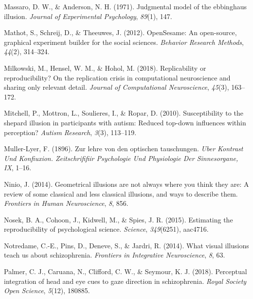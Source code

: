 \documentclass[
  english,
  man,floatsintext]{apa6}
\newlength{\cslhangindent}
\newenvironment{cslreferences}%
  {\setlength{\parindent}{0pt}%
  \everypar{\setlength{\hangindent}{\cslhangindent}}\ignorespaces}%
  {\par}
\begin{document}
\begin{cslreferences}
\leavevmode\hypertarget{ref-massaro1971judgmental}{}%
Massaro, D. W., \& Anderson, N. H. (1971). Judgmental model of the ebbinghaus illusion. \emph{Journal of Experimental Psychology}, \emph{89}(1), 147.

\leavevmode\hypertarget{ref-mathot2012opensesame}{}%
Mathot, S., Schreij, D., \& Theeuwes, J. (2012). OpenSesame: An open-source, graphical experiment builder for the social sciences. \emph{Behavior Research Methods}, \emph{44}(2), 314--324.

\leavevmode\hypertarget{ref-milkowski2018replicability}{}%
Milkowski, M., Hensel, W. M., \& Hohol, M. (2018). Replicability or reproducibility? On the replication crisis in computational neuroscience and sharing only relevant detail. \emph{Journal of Computational Neuroscience}, \emph{45}(3), 163--172.

\leavevmode\hypertarget{ref-mitchell2010susceptibility}{}%
Mitchell, P., Mottron, L., Soulieres, I., \& Ropar, D. (2010). Susceptibility to the shepard illusion in participants with autism: Reduced top-down influences within perception? \emph{Autism Research}, \emph{3}(3), 113--119.

\leavevmode\hypertarget{ref-muller1896lehre}{}%
Muller-Lyer, F. (1896). Zur lehre von den optischen tauschungen. \emph{Uber Kontrast Und Konfiuxion. Zeitschrififiir Psychologie Und Physiologie Der Sinnesorgane, IX}, 1--16.

\leavevmode\hypertarget{ref-ninio2014geometrical}{}%
Ninio, J. (2014). Geometrical illusions are not always where you think they are: A review of some classical and less classical illusions, and ways to describe them. \emph{Frontiers in Human Neuroscience}, \emph{8}, 856.

\leavevmode\hypertarget{ref-open2015estimating}{}%
Nosek, B. A., Cohoon, J., Kidwell, M., \& Spies, J. R. (2015). Estimating the reproducibility of psychological science. \emph{Science}, \emph{349}(6251), aac4716.

\leavevmode\hypertarget{ref-notredame2014visual}{}%
Notredame, C.-E., Pins, D., Deneve, S., \& Jardri, R. (2014). What visual illusions teach us about schizophrenia. \emph{Frontiers in Integrative Neuroscience}, \emph{8}, 63.

\leavevmode\hypertarget{ref-palmer2018perceptual}{}%
Palmer, C. J., Caruana, N., Clifford, C. W., \& Seymour, K. J. (2018). Perceptual integration of head and eye cues to gaze direction in schizophrenia. \emph{Royal Society Open Science}, \emph{5}(12), 180885.


\end{cslreferences}
\end{document}
